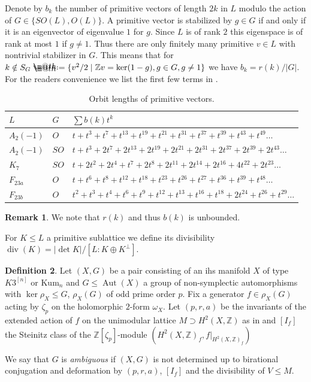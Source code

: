 \documentclass{amsart}
\makeatletter
\theoremstyle{definition}
\newtheorem{definition}{Definition}[section]
\newtheorem{remark}[definition]{Remark}
\theoremstyle{plain}
\DeclareMathOperator{\Aut}{Aut}
\newcommand{\ZZ}{\mathbb{Z}}
\newcommand{\IZ}{\mathbb{Z}}
\newcommand{\kumn}{\mathrm{Kum}_n}
\newcommand{\hskn}{K3^{\left[n\right]}}
\newcommand*{\defeq}{\mathrel{\rlap{%
                     \raisebox{0.3ex}{$\m@th\cdot$}}%
                     \raisebox{-0.3ex}{$\m@th\cdot$}}%
                     =}
\renewcommand{\div}{\mathop{div}}
\makeatother
\begin{document}
Denote by $b_k$ the number of primitive vectors of length $2k$ in $L$ modulo the action of $G \in \{SO(L),O(L)\}$.
A primitive vector is stabilized by $g \in G$ if and only if it is an eigenvector of eigenvalue $1$ for $g$. Since $L$ is of rank $2$ this eigenspace is of rank at most $1$ if $g\neq 1$.
Thus there are only finitely many primitive $v \in L$ with nontrivial stabilizer in $G$.
This means that for $k \notin S_G \defeq \{v^2/2 \mid \ZZ v = \ker (1-g), g\in G, g\neq 1\}$ we have $b_k = r(k)/|G|$. For the readers convenience we list the first few terms in .

\begin{table}
\centering
\caption{Orbit lengths of primitive vectors.} \label{tbl: orbit lengths}
\begin{tabular}{lll}
\toprule
$L$ & $G$ & $\sum b(k) t^k$\\
\midrule
$A_2(-1)$ &  $O$ &$t + t^{3} + t^{7} + t^{13} + t^{19} + t^{21} + t^{31} + t^{37} + t^{39} + t^{43} + t^{49}\dots$\\
$A_2(-1)$ & $SO$ &$t + t^{3} + 2t^{7} + 2t^{13} + 2t^{19} + 2t^{21} + 2t^{31} + 2t^{37} + 2t^{39} + 2t^{43}  \dots$\\
$K_7$ & $SO$ &$t + 2t^{2} + 2t^{4} + t^{7} + 2t^{8} + 2t^{11} + 2t^{14} + 2t^{16} + 4t^{22} + 2t^{23} \dots$\\
$F_{23a}$ & $O$ &$t + t^{6} + t^{8} + t^{12} + t^{18} + t^{23} + t^{26} + t^{27} + t^{36} + t^{39} + t^{48}\dots$\\
$F_{23b}$ & $O$ &$t^{2} + t^{3} + t^{4} + t^{6} + t^{9} + t^{12} + t^{13} + t^{16} + t^{18} + 2t^{24} + t^{26} + t^{29}\dots$\\
\bottomrule
\end{tabular}
\end{table}

\begin{remark}
 We note that $r(k)$ and thus $b(k)$ is unbounded.
\end{remark}



For $K \leq L$ a primitive sublattice we define its divisibility $\div(K)=|\det K| / [L : K \oplus K^\perp]$.

\begin{definition}
 Let $(X,G)$ be a pair consisting of an ihs manifold $X$ of type $\hskn$ or $\kumn$ and $G \leq \Aut(X)$ a group of non-symplectic automorphisms with $\ker \rho_X \leq G$, $\rho_X(G)$ of odd prime order $p$. Fix a generator $f \in \rho_X(G)$ acting by $\zeta_p$ on the holomorphic $2$-form $\omega_X$. Let $(p,r,a)$ be the invariants of the extended action of $f$ on the unimodular lattice $M \supset H^2(X,\IZ)$ as in  and $[I_f]$ the Steinitz class of the $\ZZ[\zeta_p]$-module $(H^2(X,\ZZ)_f,f|_{H^2(X,\ZZ)_f})$

 We say that $G$ is \emph{ambiguous} if $(X,G)$ is not determined up to birational conjugation and deformation by $(p,r,a)$, $[I_f]$ and
 the divisibility of $V \leq M$.
 \end{definition}
\end{document}
